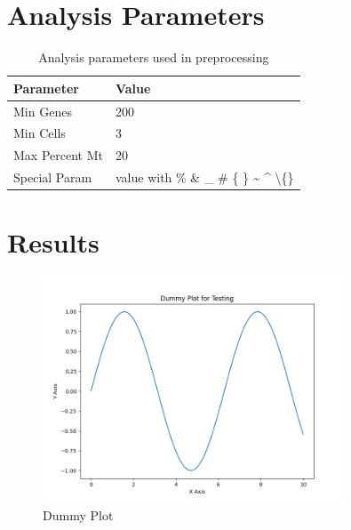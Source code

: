 \documentclass[12pt]{article}
\begin{document}
\section{Analysis Parameters}
\begin{table}[H]
    \centering
    \begin{tabular}{ll}
        \toprule
        \textbf{Parameter} & \textbf{Value} \\
        \midrule
        Min Genes & 200 \\
        Min Cells & 3 \\
        Max Percent Mt & 20 \\
        Special Param & value with \% \& \_ \# \{ \} \textasciitilde{} \textasciicircum{} \textbackslash\{\} \\

        \bottomrule
    \end{tabular}
    \caption{Analysis parameters used in preprocessing}
    \label{tab:parameters}
\end{table}

\section{{Results}}

    \begin{figure}[H]
        \centering
        \includegraphics[width=0.8\textwidth]{dummy_plot.png}
        \caption{Dummy Plot}
        \label{fig:dummy_plot}
    \end{figure}
    \newpage
\end{document}
